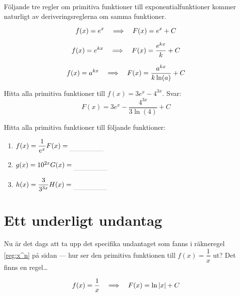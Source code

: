 \documentclass[a4paper, 12pt]{article}
\begin{document}
Följande tre regler om primitiva funktioner till exponentialfunktioner kommer naturligt av deriveringsreglerna om samma funktioner.


\begin{regel}
    \label{reg:e^x}
    \[f(x) = e^x \hspace{1em} \Longrightarrow \hspace{1em} F(x) = e^x + C\]
\end{regel}

\begin{regel}
    \[f(x) = e^{kx} \hspace{1em} \Longrightarrow \hspace{1em} F(x) = \dfrac{e^{kx}}k + C\]
\end{regel}

\begin{regel}
    \[f(x) = a^{kx} \hspace{1em} \Longrightarrow \hspace{1em} F(x) = \dfrac{a^{kx}}{k\ln(a)} + C\]
\end{regel}


\begin{exempel}
    \label{ex:a^kx}
    Hitta alla primitiva funktioner till $f(x) = 3e^x - 4^{3x}$.
    \dinkus
    Svar: \[F(x) = 3e^x- \dfrac{4^{3x}}{3\ln (4)} + C\]
\end{exempel}

\begin{uppgifter}
    \label{upp:a^kx}
    Hitta alla primitiva funktioner till följande funktioner: 
    \begin{multicols}{3}
        \begin{enumerate}
            \item $f(x) = \dfrac 1{e^x} \\ F(x) \ans$
            \item $g(x) = 10^{2x}  \\ G(x) \ans$
            \item $h(x) = \dfrac 3{3^{3x}} \\ H(x) \ans$
        \end{enumerate}
    \end{multicols}
\end{uppgifter}

\section{Ett underligt undantag}
Nu är det dags att ta upp det specifika undantaget som fanns i räkneregel \ref{reg:x^n} på sidan \pageref{reg:x^n} --- hur ser den primitiva funktionen till $f(x) = \dfrac{1}{x}$ ut? Det finns en regel\dots

\begin{regel}
    \label{reg:x^-1}
    \[f(x) =  \dfrac 1x \hspace{1em} \Longrightarrow \hspace{1em} F(x) = \ln\vert x \vert + C\]
\end{regel}
\end{document}
